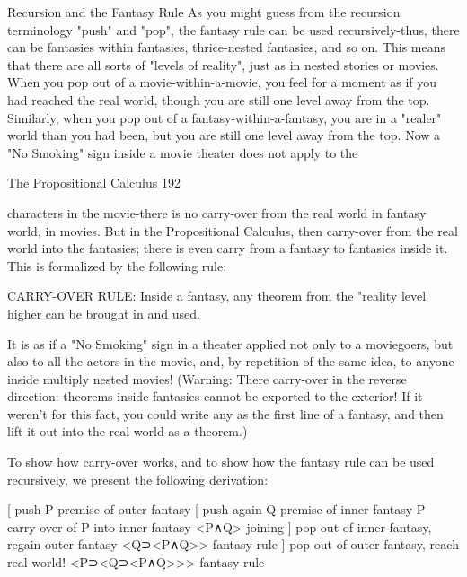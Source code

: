                          Recursion and the Fantasy Rule
As you might guess from the recursion terminology "push" and "pop", the fantasy rule
can be used recursively-thus, there can be fantasies within fantasies, thrice-nested
fantasies, and so on. This means that there are all sorts of "levels of reality", just as in
nested stories or movies. When you pop out of a movie-within-a-movie, you feel for a
moment as if you had reached the real world, though you are still one level away from the
top. Similarly, when you pop out of a fantasy-within-a-fantasy, you are in a "realer"
world than you had been, but you are still one level away from the top.
        Now a "No Smoking" sign inside a movie theater does not apply to the



The Propositional Calculus                                                              192

characters in the movie-there is no carry-over from the real world in fantasy world, in
movies. But in the Propositional Calculus, then carry-over from the real world into the
fantasies; there is even carry from a fantasy to fantasies inside it. This is formalized by
the following rule:

CARRY-OVER RULE: Inside a fantasy, any theorem from the "reality level higher can
    be brought in and used.

It is as if a "No Smoking" sign in a theater applied not only to a moviegoers, but also to
all the actors in the movie, and, by repetition of the same idea, to anyone inside multiply
nested movies! (Warning: There carry-over in the reverse direction: theorems inside
fantasies cannot be exported to the exterior! If it weren't for this fact, you could write any
as the first line of a fantasy, and then lift it out into the real world as a theorem.)

        To show how carry-over works, and to show how the fantasy rule can be used
recursively, we present the following derivation:

       [                                      push
           P                                  premise of outer fantasy
           [                                  push again
               Q                              premise of inner fantasy
               P                              carry-over of P into inner fantasy
               <P∧Q>                          joining
           ]                                  pop out of inner fantasy, regain outer fantasy
           <Q⊃<P∧Q>>                          fantasy rule
       ]                                      pop out of outer fantasy, reach real world!
       <P⊃<Q⊃<P∧Q>>>                          fantasy rule

